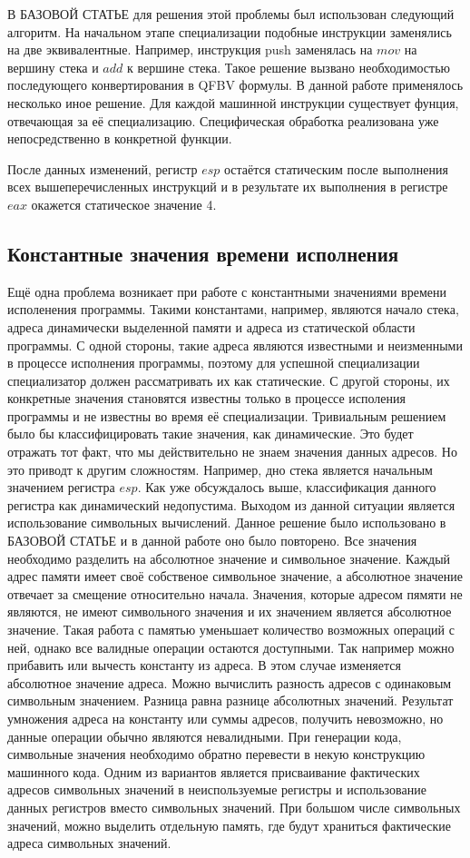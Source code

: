 \documentclass{spbau-diploma}
\begin{document}
В {\LARGE БАЗОВОЙ СТАТЬЕ} для решения этой проблемы был использован следующий алгоритм. На начальном этапе специализации подобные инструкции заменялись на две эквивалентные. Например, инструкция push заменялась на $mov$ на вершину стека и $add$ к вершине стека. Такое решение вызвано необходимостью последующего конвертирования в QFBV формулы. В данной работе применялось несколько иное решение. Для каждой машинной инструкции существует фунция, отвечающая за её специализацию. Специфическая обработка реализована уже непосредственно в конкретной функции.

После данных изменений, регистр $esp$ остаётся статическим после выполнения всех вышеперечисленных инструкций и в результате их выполнения в регистре $eax$ окажется статическое значение 4.

\subsection{ Константные значения времени исполнения}
Ещё одна проблема возникает при работе с константными значениями времени исполенения программы. Такими константами, например, являются начало стека, адреса динамически выделенной памяти и адреса из статической области программы. С одной стороны, такие адреса являются известными и неизменными в процессе исполнения программы, поэтому для успешной специализации специализатор должен рассматривать их как статические. С другой стороны, их конкретные значения становятся известны только в процессе исполения программы и не известны во время её специализации.  Тривиальным решением было бы классифицировать такие значения, как динамические. Это будет отражать тот факт, что мы действительно не знаем значения данных адресов. Но это приводт к другим сложностям. Например, дно стека является начальным значением регистра $esp$. Как уже обсуждалось выше, классификация данного регистра как динамический недопустима. Выходом из данной ситуации является использование символьных вычислений. Данное решение было использовано в {\LARGE БАЗОВОЙ СТАТЬЕ} и в данной работе оно было повторено. Все значения необходимо разделить на абсолютное значение и символьное значение. Каждый адрес памяти имеет своё собственое символьное значение, а абсолютное значение отвечает за смещение относительно начала. Значения, которые адресом пямяти не являются, не имеют символьного значения и их значением является абсолютное значение. Такая работа с памятью уменьшает количество возможных операций с ней, однако все валидные операции остаются доступными. Так например можно прибавить или вычесть константу из адреса. В этом случае изменяется абсолютное значение адреса. Можно вычислить разность адресов с одинаковым символьным значением. Разница равна разнице абсолютных значений. Результат умножения адреса на константу или суммы адресов, получить невозможно, но данные операции обычно являются невалидными. При генерации кода, символьные значения необходимо обратно перевести в некую конструкцию машинного кода. Одним из вариантов является присваивание фактических адресов символьных значений в неиспользуемые регистры и использование данных регистров вместо символьных значений. При большом числе символьных значений, можно выделить отдельную память, где будут храниться фактические адреса символьных значений.
\end{document}
